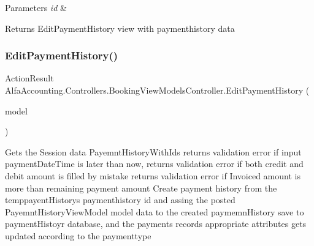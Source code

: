 \begin{DoxyParams}{Parameters}
{\em id} & \\
\hline
\end{DoxyParams}
\begin{DoxyReturn}{Returns}
Edit\+Payment\+History view with paymenthistory data
\end{DoxyReturn}
\mbox{\label{class_alfa_accounting_1_1_controllers_1_1_booking_view_models_controller_a5f9d68347caac3e53ab18b4afb468a24}} 
\subsubsection{\texorpdfstring{Edit\+Payment\+History()}{EditPaymentHistory()}\hspace{0.1cm}{\footnotesize\ttfamily [2/2]}}
{\footnotesize\ttfamily Action\+Result Alfa\+Accounting.\+Controllers.\+Booking\+View\+Models\+Controller.\+Edit\+Payment\+History (\begin{DoxyParamCaption}\item[{Payment\+History\+View\+Model}]{model }\end{DoxyParamCaption})}



Gets the Session data Payemnt\+History\+With\+Ids returns validation error if input payment\+Date\+Time is later than now, returns validation error if both credit and debit amount is filled by mistake returns validation error if Invoiced amount is more than remaining payment amount Create payment history from the temppayent\+History\textquotesingle{}s paymenthistory id and assing the posted Payemnt\+History\+View\+Model model data to the created paymemn\+History save to payment\+Histoyr database, and the payments record\textquotesingle{}s appropriate attributes gets updated according to the paymenttype 


